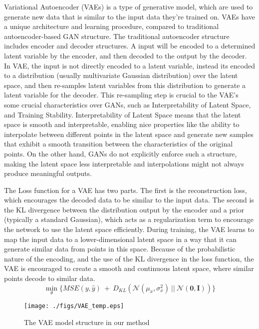 Variational Autoencoder (VAEs) is a type of generative model, which are used to generate new data that is similar to the input data they're trained on.  VAEs have a unique architecture and learning procedure, compared to traditional autoencoder-based GAN structure. The traditional autoencoder structure includes encoder and decoder structures. A input will be encoded to a determined latent variable by the encoder, and then decoded to the output by the decoder. 
In VAE, the input is not directly encoded to a latent variable, instead its encoded to a distribution (usually multivariate Gaussian distribution) over the latent space,  and then re-samples latent variables from this distribution to generate a latent variable for the decoder. This re-sampling step is crucial to the VAE's some crucial characteristics over GANs, such as Interpretability of Latent Space, and Training Stability.
Interpretability of Latent Space means that the latent space is smooth and interpretable, enabling nice properties like the ability to interpolate between different points in the latent space and generate new samples that exhibit a smooth transition between the characteristics of the original points. On the other hand, GANs do not explicitly enforce such a structure, making the latent space less interpretable and interpolations might not always produce meaningful outputs. 

The Loss function for a VAE has two parts. The first is the reconstruction loss, which encourages the decoded data to be similar to the input data. The second is the KL divergence between the distribution output by the encoder and a prior (typically a standard Gaussian), which acts as a regularization term to encourage the network to use the latent space efficiently.  During training, the VAE learns to map the input data to a lower-dimensional latent space in a way that it can generate similar data from points in this space. Because of the probabilistic nature of the encoding, and the use of the KL divergence in the loss function, the VAE is encouraged to create a smooth and continuous latent space, where similar points decode to similar data.
\begin{equation}
	\min_{\theta}  \{  \textit{MSE} (y , \hat{y} )   ~ + ~  D_{KL}( \mathcal{N}(\mu_{x}, \sigma_{x}^{2}) ~ || ~ \mathcal{N}(\textbf{0}, \textbf{I} ) )  \}
\end{equation}

\begin{figure*}[h!]
	\centering
	\texttt{[image: ./figs/VAE\_temp.eps]}
	\caption{The VAE model structure in our method} 
	\label{fig:VAE_architecture}
\end{figure*}

